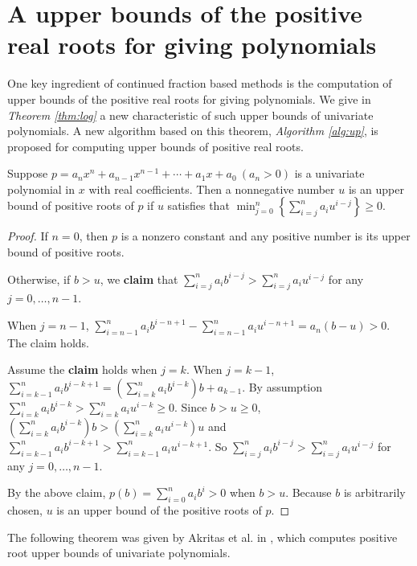 
\section{A  upper bounds of the positive real roots for giving  polynomials}
\label{sec:thm}

One key ingredient of continued fraction based methods is the computation of upper bounds of the positive real roots for giving  polynomials. We give in {\em Theorem \ref{thm:log}} a new characteristic of such upper bounds of univariate polynomials. A new algorithm based on this theorem, {\em Algorithm \ref{alg:up}}, is proposed for computing upper bounds of positive real roots.


\begin{theorem} \label{thm:log}
  Suppose   $p=a_nx^n+a_{n-1}x^{n-1}+\cdots+a_1x+a_0\ (a_n>0)$  is a univariate polynomial in $x$ with real coefficients.  Then  a nonnegative number $u$ is an upper bound of positive roots of $p$ if $u$   satisfies that $\min_{j=0}^{n}\left\{  \sum_{i=j}^n a_i u^{i-j}\right\}\ge0$.
\end{theorem}
\begin{proof}
  If $n=0$, then $p$ is a nonzero constant and any positive number is its upper bound of positive roots.

  Otherwise, if $b>u$,  we {\bf claim} that $\sum_{i=j}^na_ib^{i-j}> \sum_{i=j}^na_iu^{i-j}$ for any $j= 0,\ldots,n-1$.

  When $j=n-1$, $\sum_{i=n-1}^na_ib^{i-n+1}-\sum_{i=n-1}^na_iu^{i-n+1}=a_n(b-u)>0.$ The claim holds.

  Assume the {\bf claim} holds  when $j=k$. When $j=k-1$,  $\sum_{i=k-1}^na_ib^{i-k+1}=\left(\sum_{i=k}^na_ib^{i-k}\right)b+a_{k-1} $. By assumption
  $\sum_{i=k}^na_ib^{i-k}>\sum_{i=k}^na_iu^{i-k}\ge0$. Since $b>u\ge0$, $\left(\sum_{i=k}^na_ib^{i-k}\right)b>\left (\sum_{i=k}^na_iu^{i-k} \right)u  $
  and $\sum_{i=k-1}^na_ib^{i-k+1}> \sum_{i=k-1}^na_iu^{i-k+1}$. So  $\sum_{i=j}^na_ib^{i-j}> \sum_{i=j}^na_iu^{i-j}$ for any $j= 0,\ldots,n-1$.


  By the above claim,   $p(b)=\sum_{i=0}^na_ib^i>0$ when  $b>u$. Because $b$ is arbitrarily chosen, $u$ is an upper bound of the positive roots of $p$.

\end{proof}


The following theorem was given by Akritas et al. in  \cite{akr08}, which computes positive root upper bounds of univariate polynomials.

